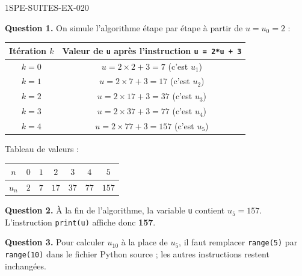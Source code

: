 \begin{corrige}{1SPE-SUITES-EX-020}


\textbf{Question 1.} On simule l'algorithme étape par étape à partir de $u = u_0 = 2$ :

\medskip
\begin{center}
\begin{tabular}{|c|c|}
\hline
Itération $k$ & Valeur de \texttt{u} après l'instruction \texttt{u = 2*u + 3} \\
\hline
$k = 0$ & $u = 2 \times 2 + 3 = 7$ (c'est $u_1$) \\
\hline
$k = 1$ & $u = 2 \times 7 + 3 = 17$ (c'est $u_2$) \\
\hline
$k = 2$ & $u = 2 \times 17 + 3 = 37$ (c'est $u_3$) \\
\hline
$k = 3$ & $u = 2 \times 37 + 3 = 77$ (c'est $u_4$) \\
\hline
$k = 4$ & $u = 2 \times 77 + 3 = 157$ (c'est $u_5$) \\
\hline
\end{tabular}
\end{center}
\medskip

Tableau de valeurs :

\medskip
\begin{tabular}{|c|c|c|c|c|c|c|}
\hline
$n$ & $0$ & $1$ & $2$ & $3$ & $4$ & $5$ \\
\hline
$u_n$ & $2$ & $7$ & $17$ & $37$ & $77$ & $157$ \\
\hline
\end{tabular}
\medskip


\textbf{Question 2.} À la fin de l'algorithme, la variable \texttt{u} contient $u_5 = 157$. L'instruction \texttt{print(u)} affiche donc \textbf{157}.


\textbf{Question 3.} Pour calculer $u_{10}$ à la place de $u_5$, il faut remplacer \texttt{range(5)} par \texttt{range(10)} dans le fichier Python source ; les autres instructions restent inchangées.

\end{corrige}
